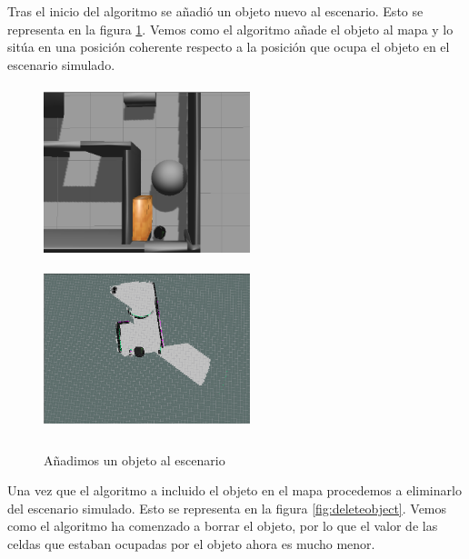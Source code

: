 Tras el inicio del algoritmo se añadió un objeto nuevo al escenario. Esto se representa en la figura \ref{fig:includeobject}. Vemos como el algoritmo añade el objeto al mapa y lo sitúa en una posición coherente respecto a la posición que ocupa el objeto en el escenario simulado.

\begin{figure} [H]
  \begin{center}
    \includegraphics[width=6cm,height=5cm]{img/cap5/incrementmap-object3}
    \includegraphics[width=6cm,height=5cm]{img/cap5/incrementmap-object}
  \end{center}
  \caption{Añadimos un objeto al escenario}
  \label{fig:includeobject}
\end{figure}

Una vez que el algoritmo a incluido el objeto en el mapa procedemos a eliminarlo del escenario simulado. Esto se representa en la figura  \ref{fig:deleteobject}. Vemos como el algoritmo ha comenzado a borrar el objeto, por lo que el valor de las celdas que estaban ocupadas por el objeto ahora es mucho menor.

